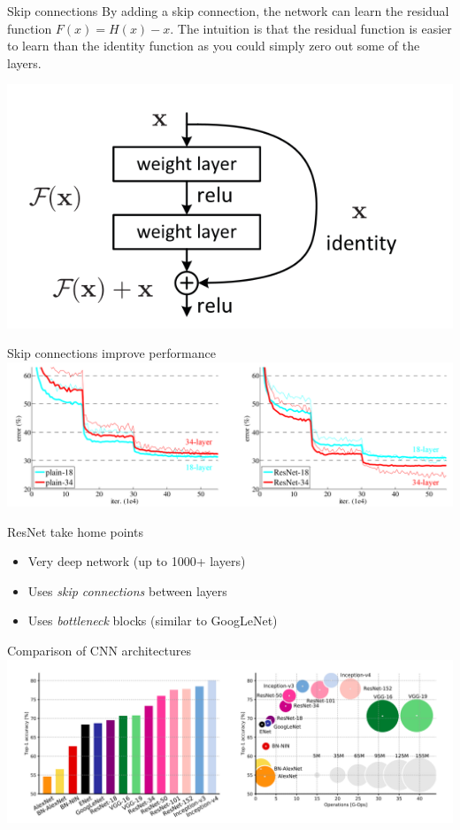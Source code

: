 \documentclass[9pt, aspectratio=169]{beamer}
\begin{document}
\begin{frame}
{Skip connections}
By adding a skip connection, the network can learn the residual function $F(x) = H(x) - x$. The intuition is that the residual function is easier to learn than the identity function as you could simply zero out some of the layers.

\centering
\includegraphics[width=.4\textwidth]{resnet_identity.png}
\end{frame}

\begin{frame}
{Skip connections improve performance}
\centering
\includegraphics[width=\textwidth]{resnet_training.png}
\end{frame}

\begin{frame}
    {ResNet take home points}
    \begin{itemize}
        \item Very deep network (up to 1000+ layers)
        \item Uses \textit{skip connections} between layers
        \item Uses \textit{bottleneck} blocks (similar to GoogLeNet)
    \end{itemize}
\end{frame}

\begin{frame}
    {Comparison of CNN architectures}
    \centering
    \includegraphics[width=\textwidth]{comparison.png}
\end{frame}
\end{document}
